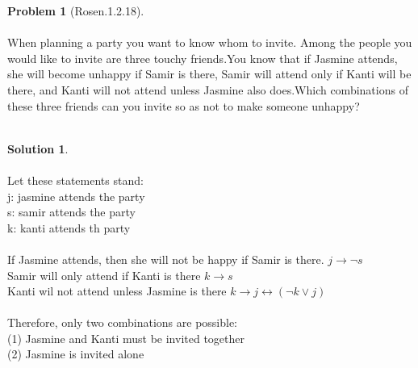 \documentclass{article}
\theoremstyle{definition}
\newtheorem*{problem}{Problem}
\newtheorem*{solution}{Solution}
\begin{document}
\begin{problem}[Rosen.1.2.18]\ \\
\ \\
When planning a party you want to know whom to invite.
Among the people you would like to invite are three
touchy friends.You know that if Jasmine attends, she will
become unhappy if Samir is there, Samir will attend only
if Kanti will be there, and Kanti will not attend unless Jasmine
also does.Which combinations of these three friends
can you invite so as not to make someone unhappy?\ \\
\ \\
\begin{compactenum}
\renewcommand{\theenumi}{\alph{enumi}}
\end{compactenum}
\end{problem}

\begin{solution}\ \\
\ \\
\noindent
Let these statements stand:\ \\
j: jasmine attends the party\ \\
s: samir attends the party\ \\
k: kanti attends th party\ \\
\ \\
If Jasmine attends, then she will not be happy if Samir is there. $j \rightarrow \neg s$\ \\
Samir will only attend if Kanti is there $k \rightarrow s$\ \\
Kanti wil not attend unless Jasmine is there $k \rightarrow j \leftrightarrow (\neg k \vee j)$\ \\
\ \\
Therefore, only two combinations are possible:\ \\
(1) Jasmine and Kanti must be invited together\ \\
(2) Jasmine is invited alone\ \\
\begin{compactenum}
\renewcommand{\theenumi}{\alph{enumi}}


\end{compactenum}
\end{solution}
\end{document}
